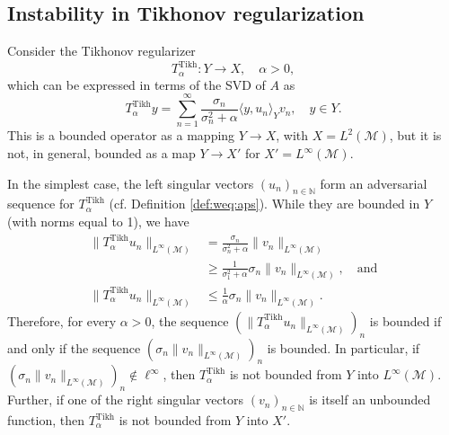 \documentclass{article}
\theoremstyle{definition}
\newcommand{\N}{\mathbb{N}}
\newcommand{\smallnorm}[1]{\lVert#1\rVert}
\begin{document}
\subsection{Instability in Tikhonov regularization}
Consider the Tikhonov regularizer \cite{engl2000regularization}
\begin{equation*}
    T^{\mathrm{Tikh}}_{\alpha}\colon Y\to X, \quad \alpha>0,
\end{equation*}
which can be expressed in terms of the SVD of \(A\) as
\begin{equation*}
    T^{\mathrm{Tikh}}_{\alpha}y = 
    \sum_{n=1}^\infty \frac{\sigma_n}{\sigma_n^2+\alpha}\langle y, u_n\rangle_Y v_n,\quad y\in Y.
\end{equation*}
This is a bounded operator as a mapping \(Y\to X\), with \(X=L^2(\mathcal{M})\),
but it is not, in general, bounded as a map \(Y\to X'\) for \(X'=L^\infty(\mathcal{M})\).

In the simplest case, the left singular vectors \((u_n)_{n\in\N}\) form an adversarial sequence for \(T^{\mathrm{Tikh}}_{\alpha}\) (cf. Definition \ref{def:weq:aps}).
While they are bounded in \(Y\) (with norms equal to 1), we have
\begin{align*}
    \smallnorm{T^{\mathrm{Tikh}}_{\alpha} u_n}_{L^\infty(\mathcal{M})}
    &=
    \frac{\sigma_n}{\sigma_n^2+\alpha}\smallnorm{v_n}_{L^\infty(\mathcal{M})}
    \\
    &\geq 
    \frac{1}{\sigma_1^2+\alpha}
    \sigma_n\smallnorm{v_n}_{L^\infty(\mathcal{M})},
    \quad\text{and}\\
    \smallnorm{T^{\mathrm{Tikh}}_{\alpha} u_n}_{L^\infty(\mathcal{M})}
    &\leq
    \frac{1}{\alpha}
    \sigma_n\smallnorm{v_n}_{L^\infty(\mathcal{M})}.
\end{align*}
Therefore, for every $\alpha>0$, the sequence $(\smallnorm{T^{\mathrm{Tikh}}_{\alpha} u_n}_{L^\infty(\mathcal{M})})_n$ is bounded if and only if the sequence \((\sigma_n\smallnorm{v_n}_{L^\infty(\mathcal{M})})_n\) is bounded.
In particular, if \((\sigma_n\smallnorm{v_n}_{L^\infty(\mathcal{M})})_n\notin\ell^\infty\), then  \(T^{\mathrm{Tikh}}_{\alpha}\) is not bounded from $Y$ into \(L^\infty(\mathcal{M})\).
Further, if one of the right singular vectors \((v_n)_{n\in\N}\) is itself an unbounded function, then \(T^{\mathrm{Tikh}}_{\alpha}\) is not bounded from $Y$ into $X'$.
\end{document}

